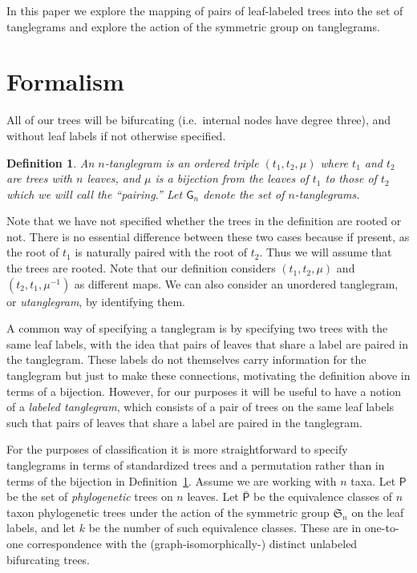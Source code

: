 \documentclass{amsart}
\newtheorem{definition}[theorem]{Definition}
\newcommand{\fS}{\mathfrak S}
\newcommand{\pairing}{\mu}
\newcommand{\tangle}{\mathsf{G}}
\newcommand{\ptree}{\mathsf{P}}
\newcommand{\ptequiv}{\bar{\ptree}}  %
\begin{document}
In this paper we explore the mapping of pairs of leaf-labeled trees into the set of tanglegrams and explore the action of the symmetric group on tanglegrams.


\section{Formalism}
All of our trees will be bifurcating (i.e.\ internal nodes have degree three), and without leaf labels if not otherwise specified.

\begin{definition}
\label{def:tanglegram}
An $n$-\emph{tanglegram} is an ordered triple $(t_1, t_2, \pairing)$ where $t_1$ and $t_2$ are trees with $n$ leaves, and $\pairing$ is a bijection from the leaves of $t_1$ to those of $t_2$ which we will call the ``pairing.''
Let $\tangle_n$ denote the set of $n$-tanglegrams.
\end{definition}
Note that we have not specified whether the trees in the definition are rooted or not.
There is no essential difference between these two cases because if present, as the root of $t_1$ is naturally paired with the root of $t_2$.
Thus we will assume that the trees are rooted.
Note that our definition considers $(t_1, t_2, \pairing)$ and $(t_2, t_1, \pairing^{-1})$ as different maps.
We can also consider an unordered tanglegram, or \emph{utanglegram}, by identifying them.

A common way of specifying a tanglegram is by specifying two trees with the same leaf labels, with the idea that pairs of leaves that share a label are paired in the tanglegram.
These labels do not themselves carry information for the tanglegram but just to make these connections, motivating the definition above in terms of a bijection.
However, for our purposes it will be useful to have a notion of a \emph{labeled tanglegram}, which consists of a pair of trees on the same leaf labels such that pairs of leaves that share a label are paired in the tanglegram.

For the purposes of classification it is more straightforward to specify tanglegrams in terms of standardized trees and a permutation rather than in terms of the bijection in Definition~\ref{def:tanglegram}.
Assume we are working with $n$ taxa.
Let $\ptree$ be the set of \emph{phylogenetic} trees on $n$ leaves.
Let $\ptequiv$ be the equivalence classes of $n$ taxon phylogenetic trees under the action of the symmetric group $\fS_n$ on the leaf labels, and let $k$ be the number of such equivalence classes.
These are in one-to-one correspondence with the (graph-isomorphically-) distinct unlabeled bifurcating trees.
\end{document}
